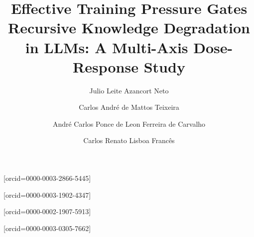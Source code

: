 \documentclass[a4paper,fleqn]{cas-dc}
\begin{document}
\let\WriteBookmarks\relax
\def\floatpagefraction{.85}
\def\textfraction{.1}
\def\topfraction{.9}
\def\bottomfraction{.9}
\setcounter{topnumber}{4}
\setcounter{bottomnumber}{4}
\setcounter{totalnumber}{8}

\setlength{\textfloatsep}{4pt plus 1pt minus 1pt}
\setlength{\floatsep}{4pt plus 1pt minus 1pt}
\setlength{\intextsep}{4pt plus 1pt minus 1pt}
\setlength{\dbltextfloatsep}{4pt plus 1pt minus 1pt}
\setlength{\dblfloatsep}{4pt plus 1pt minus 1pt}
\setlength{\abovecaptionskip}{2pt}
\setlength{\belowcaptionskip}{0pt}


\title[mode=title]{Effective Training Pressure Gates Recursive Knowledge
  Degradation in LLMs: A Multi-Axis Dose-Response Study}










\author[1]{Julio Leite Azancort Neto}[orcid=0000-0003-2866-5445]

\author[1,2]{Carlos André de Mattos Teixeira}[orcid=0000-0003-1902-4347]

\author[3]{André Carlos Ponce de Leon Ferreira de Carvalho}[orcid=0000-0002-1907-5913]

\author[1]{Carlos Renato Lisboa Francês}[orcid=0000-0003-0305-7662]

\address[1]{Instituto de Tecnologia, Universidade Federal do Pará (UFPA),
  Belém, PA, Brazil}
\address[2]{Amazon Sustainability Institute with Science and Innovation (iSACI),
  Belém, PA, Brazil}
\address[3]{Instituto de Ciências Matemáticas e de Computação (ICMC),
  Universidade de São Paulo (USP), São Carlos, SP, Brazil}
\end{document}
